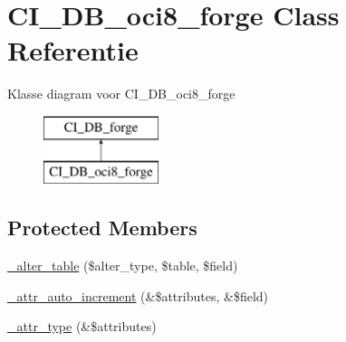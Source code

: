 \hypertarget{class_c_i___d_b__oci8__forge}{}\section{C\+I\+\_\+\+D\+B\+\_\+oci8\+\_\+forge Class Referentie}
\label{class_c_i___d_b__oci8__forge}
Klasse diagram voor C\+I\+\_\+\+D\+B\+\_\+oci8\+\_\+forge\begin{figure}[H]
\begin{center}
\leavevmode
\includegraphics[height=2.000000cm]{class_c_i___d_b__oci8__forge}
\end{center}
\end{figure}
\subsection*{Protected Members}
\begin{DoxyCompactItemize}
\item 
\mbox{\hyperlink{class_c_i___d_b__oci8__forge_a41c6cae02f2fda8b429ad0afb9509426}{\+\_\+alter\+\_\+table}} (\$alter\+\_\+type, \$table, \$field)
\item 
\mbox{\hyperlink{class_c_i___d_b__oci8__forge_a2a013a5932439c3c44f0dad3436525f7}{\+\_\+attr\+\_\+auto\+\_\+increment}} (\&\$attributes, \&\$field)
\item 
\mbox{\hyperlink{class_c_i___d_b__oci8__forge_a8553be952084c6f7cdfff370a1d14f6b}{\+\_\+attr\+\_\+type}} (\&\$attributes)
\end{DoxyCompactItemize}
